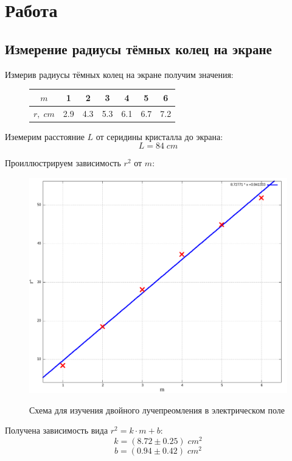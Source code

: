 \documentclass{article}
\begin{document}
\section{Работа}
\subsection{Измерение радиусы тёмных колец на экране}
Измерив радиусы тёмных колец на экране получим значения:

\begin{figure}[H]
  \centering
  \begin{tabular}[center]{|c|c|c|c|c|c|c|}
    \hline
    \(m\)      & 1   & 2   & 3   & 4   & 5   & 6\\\hline
    \(r,\; cm\) & 2.9 & 4.3 & 5.3 & 6.1 & 6.7 & 7.2\\\hline
  \end{tabular}
\end{figure}

Иземерим расстояние \(L\) от серидины кристалла до экрана:
\[ L = 84\;cm \]

Проиллюстрируем зависимость \(r^2\) от \(m\):

\begin{figure}[H]
  \centering
  \includegraphics[width=\textwidth]{r.png}\label{fig:r}
  \caption{Схема для изучения двойного лучепреомления в электрическом поле}
\end{figure}

Получена зависимость вида \(r^2 = k\cdot m + b\):
\[ k = (8.72 \pm 0.25)\;cm^2 \]
\[ b = (0.94 \pm 0.42)\;cm^2 \]
\end{document}
